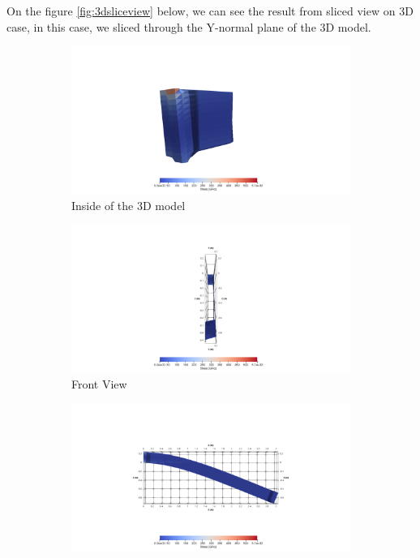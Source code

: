 \documentclass[a4paper,11pt]{article}
\begin{document}
\newpage
On the figure \ref{fig:3dsliceview} below, we can see the result from sliced view on 3D case, in this case, we sliced through the Y-normal plane of the 3D model.
\begin{figure}[h!]
	\begin{subfigure}[b]{0.5\linewidth}
		\centering
		\includegraphics[width=\linewidth]{picture/conference/3dslice2}
		\caption{Inside of the 3D model}
	\end{subfigure}
	\quad
	\begin{subfigure}[b]{0.5\linewidth}
		\centering
		\includegraphics[width=\linewidth]{picture/conference/3dslice4}
		\caption{Front View}
	\end{subfigure}
	\quad
	\begin{subfigure}[b]{0.5\linewidth}
		\centering
		\includegraphics[width=\linewidth]{picture/conference/3dslice6}

\end{subfigure}
\end{figure}
\end{document}
